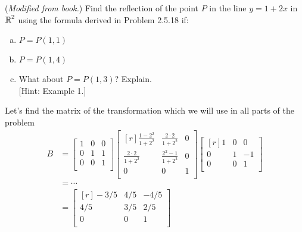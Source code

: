 \documentclass[../main.tex]{subfiles}
\begin{document}
(\emph{Modified from book.})
Find the reflection of the point $P$ in the line $y = 1 + 2x$ in $\operatorname{\mathbb{R}}^2$ using the formula derived in Problem 2.5.18 if:
\begin{enumerate}[a)]
	\item $P = P(1, 1)$
	\item $P = P(1, 4)$
	\item What about $P = P(1, 3)$? Explain. \\
	\hspace{0pt}[Hint: Example 1.]  %
\end{enumerate}

\solution
Let's find the matrix of the transformation which we will use in all parts of the problem
		\begin{align*}
			B
			&=
			\begin{bmatrix}
				1 & 0 & 0 \\
				0 & 1 & 1 \\
				0 & 0 & 1 \\
			\end{bmatrix}
			\begin{bmatrix*}[r]
				\frac{1-2^2}{1+2^2} &  \frac{2\cdot2}{1+2^2} & 0 \\
				\frac{2\cdot2}{1+2^2} & \frac{2^2-1}{1+2^2} & 0 \\
				0 & 0 & 1 \\
			\end{bmatrix*}
			\begin{bmatrix*}[r]
				1 & 0 & 0 \\
				0 & 1 & -1 \\
				0 & 0 & 1 \\
			\end{bmatrix*}
			\\&= \cdots
			\\&=
			\begin{bmatrix*}[r]
				-3/5 & 4/5 & -4/5 \\
				4/5 & 3/5 & 2/5 \\
				0 & 0 & 1 \\
			\end{bmatrix*}
		\end{align*}
\end{document}
